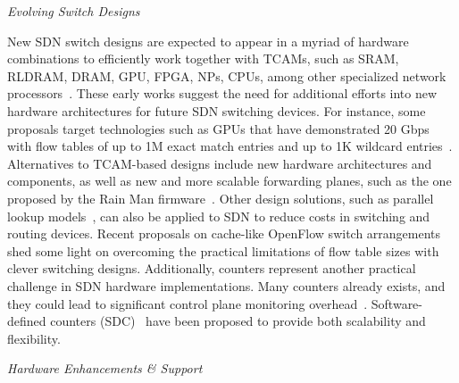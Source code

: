 
\vspace{2mm}
\noindent \textit{Evolving Switch Designs}

New SDN switch designs are expected to appear in a myriad of hardware 
combinations to efficiently work together with TCAMs, such as SRAM, RLDRAM, DRAM, GPU, FPGA, NPs, CPUs, 
among other specialized network processors~\cite{ferkouss2011,naous2008,memon2013,luo2009,rostami2012,pongracz2013}. These early works suggest the need for additional efforts into new hardware architectures for future 
SDN switching devices. For instance, some proposals target technologies such as GPUs that have demonstrated 
20 Gbps with flow tables of up to 1M exact match entries and up to 1K wildcard entries~\cite{memon2013}. 
Alternatives to TCAM-based designs include new hardware architectures and components, as well as new and more 
scalable forwarding planes, such as the one proposed by the Rain Man firmware~\cite{stephens2012}.
Other design solutions, such as parallel lookup models~\cite{li2013}, can also be applied to SDN to reduce 
costs in switching and routing devices. Recent proposals on cache-like OpenFlow switch arrangements~\cite{katta2013} shed some light on overcoming the practical limitations of 
flow table sizes with clever switching designs. Additionally, counters represent another practical challenge 
in SDN hardware implementations. Many counters already exists, and they could lead to significant control 
plane monitoring overhead~\cite{curtis2011}. Software-defined counters 
(SDC)~\cite{mogul2012} have been proposed to provide both scalability and flexibility.

\vspace{2mm}
\noindent \textit{Hardware Enhancements \& Support}

